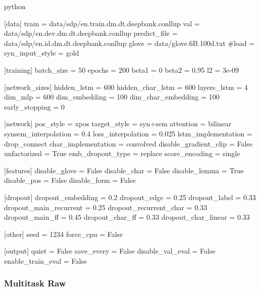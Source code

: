 \documentclass[11pt]{scrartcl}
\begin{document}
\begin{mintedbox}{python}

[data]
train                  = data/sdp/en.train.dm.dt.deepbank.conllup
val                    = data/sdp/en.dev.dm.dt.deepbank.conllup
predict_file           = data/sdp/en.id.dm.dt.deepbank.conllup
glove                  = data/glove.6B.100d.txt
#load                   = 
syn_input_style        = gold

[training]
batch_size             = 50
epochs                 = 200
beta1                  = 0
beta2                  = 0.95
l2                     = 3e-09

[network_sizes]
hidden_lstm            = 600
hidden_char_lstm       = 600
layers_lstm            = 4
dim_mlp                = 600
dim_embedding          = 100
dim_char_embedding     = 100
early_stopping         = 0

[network]
pos_style              = xpos
target_style           = syn+sem 
attention              = bilinear
synsem_interpolation   = 0.4
loss_interpolation     = 0.025
lstm_implementation    = drop_connect
char_implementation    = convolved
disable_gradient_clip  = False
unfactorized           = True
emb_dropout_type       = replace
score_encoding         = single

[features]
disable_glove          = False
disable_char           = False
disable_lemma          = True
disable_pos            = False
disable_form           = False

[dropout]
dropout_embedding      = 0.2
dropout_edge           = 0.25
dropout_label          = 0.33
dropout_main_recurrent = 0.25
dropout_recurrent_char = 0.33
dropout_main_ff        = 0.45
dropout_char_ff        = 0.33
dropout_char_linear    = 0.33

[other]
seed                   = 1234
force_cpu              = False

[output]
quiet                  = False
save_every             = False
disable_val_eval       = False
enable_train_eval      = False


\end{mintedbox}

\subsubsection{Multitask Raw}
\end{document}
